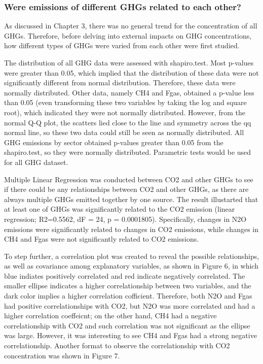 \documentclass[12pt,]{article}
\begin{document}
\subsubsection{Were emissions of different GHGs related to each
other?}\label{were-emissions-of-different-ghgs-related-to-each-other}

As discussed in Chapter 3, there was no general trend for the
concentration of all GHGs. Therefore, before delving into external
impacts on GHG concentrations, how different types of GHGs were varied
from each other were first studied.

The distribution of all GHG data were assessed with shapiro.test. Most
p-values were greater than 0.05, which implied that the distribution of
these data were not significantly different from normal distribution.
Therefore, these data were normally distributed. Other data, namely CH4
and Fgas, obtained a p-value less than 0.05 (even transforming these two
variables by taking the log and square root), which indicated they were
not normally distributed. However, from the normal Q-Q plot, the
scatters lied close to the line and symmetry across the qq normal line,
so these two data could still be seen as normally distributed. All GHG
emissions by sector obtained p-values greater than 0.05 from the
shapiro.test, so they were normally distributed. Parametric tests would
be used for all GHG dataset.

Multiple Linear Regression was conducted between CO2 and other GHGs to
see if there could be any relationships between CO2 and other GHGs, as
there are always multiple GHGs emitted together by one source. The
result illustarted that at least one of GHGs was significantly related
to the CO2 emission (linear regression; R2=0.5562, dF = 24, p =
0.0001805). Specifically, changes in N2O emissions were significantly
related to changes in CO2 emissions, while changes in CH4 and Fgas were
not significantly related to CO2 emissions.

To step further, a correlation plot was created to reveal the possible
relationships, as well as covariance among explanatory variables, as
shown in Figure 6, in which blue indiates positively correlated and red
indicate negatively correlated. The smaller ellipse indicates a higher
correlationship between two variables, and the dark color implies a
higher correlation cofficient. Therefore, both N2O and Fgas had positive
correlationships with CO2, but N2O was more correlated and had a higher
correlation coeffeicnt; on the other hand, CH4 had a negative
correlationship with CO2 and such correlation was not significant as the
ellipse was large. However, it was interesting to see CH4 and Fgas had a
strong negative correlationship. Another format to observe the
correlationship with CO2 concentration was shown in Figure 7.
\end{document}
